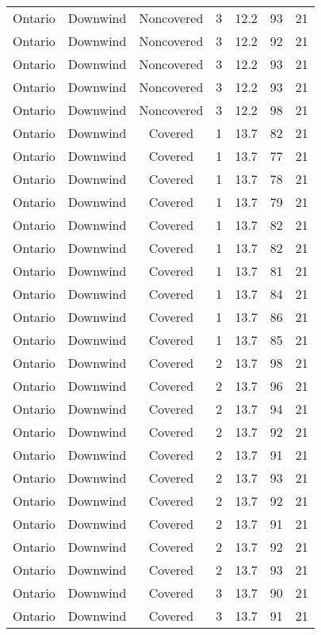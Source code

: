 \documentclass{article}
\begin{document}
\begin{longtable}[H]{ccccccc}
Ontario & Downwind & Noncovered & 3 & 12.2 & 93  & 21 \\
Ontario & Downwind & Noncovered & 3 & 12.2 & 92  & 21 \\
Ontario & Downwind & Noncovered & 3 & 12.2 & 93  & 21 \\
Ontario & Downwind & Noncovered & 3 & 12.2 & 93  & 21 \\
Ontario & Downwind & Noncovered & 3 & 12.2 & 98  & 21 \\
Ontario & Downwind & Covered     & 1 & 13.7 & 82  & 21 \\
Ontario & Downwind & Covered     & 1 & 13.7 & 77  & 21 \\
Ontario & Downwind & Covered     & 1 & 13.7 & 78  & 21 \\
Ontario & Downwind & Covered     & 1 & 13.7 & 79  & 21 \\
Ontario & Downwind & Covered     & 1 & 13.7 & 82  & 21 \\
Ontario & Downwind & Covered     & 1 & 13.7 & 82  & 21 \\
Ontario & Downwind & Covered     & 1 & 13.7 & 81  & 21 \\
Ontario & Downwind & Covered     & 1 & 13.7 & 84  & 21 \\
Ontario & Downwind & Covered     & 1 & 13.7 & 86  & 21 \\
Ontario & Downwind & Covered     & 1 & 13.7 & 85  & 21 \\
Ontario & Downwind & Covered     & 2 & 13.7 & 98  & 21 \\
Ontario & Downwind & Covered     & 2 & 13.7 & 96  & 21 \\
Ontario & Downwind & Covered     & 2 & 13.7 & 94  & 21 \\
Ontario & Downwind & Covered     & 2 & 13.7 & 92  & 21 \\
Ontario & Downwind & Covered     & 2 & 13.7 & 91  & 21 \\
Ontario & Downwind & Covered     & 2 & 13.7 & 93  & 21 \\
Ontario & Downwind & Covered     & 2 & 13.7 & 92  & 21 \\
Ontario & Downwind & Covered     & 2 & 13.7 & 91  & 21 \\
Ontario & Downwind & Covered     & 2 & 13.7 & 92  & 21 \\
Ontario & Downwind & Covered     & 2 & 13.7 & 93  & 21 \\
Ontario & Downwind & Covered     & 3 & 13.7 & 90  & 21 \\
Ontario & Downwind & Covered     & 3 & 13.7 & 91  & 21 \\

\end{longtable}
\end{document}
